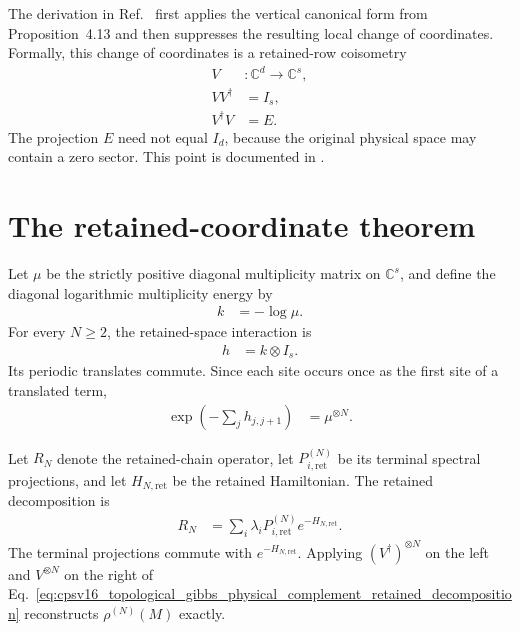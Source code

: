 \documentclass{article}
\begin{document}
The derivation in Ref.~\cite{Cirac2016MPDO_arXiv} first applies the vertical
canonical form from Proposition~4.13 and then suppresses the resulting local
change of coordinates. Formally, this change of coordinates is a retained-row
coisometry
\begin{align}
    V
        &\colon \mathbb C^d\longrightarrow\mathbb C^s,
    \label{eq:cpsv16_topological_gibbs_physical_complement_vertical_map}\\
    VV^\dagger
        &= I_s,
    \label{eq:cpsv16_topological_gibbs_physical_complement_coisometry}\\
    V^\dagger V
        &= E.
    \label{eq:cpsv16_topological_gibbs_physical_complement_retained_projection}
\end{align}
The projection $E$ need not equal $I_d$, because the original physical space
may contain a zero sector. This point is documented in
.

\section{The retained-coordinate theorem}

Let $\mu$ be the strictly positive diagonal multiplicity matrix on
$\mathbb C^s$, and define the diagonal logarithmic multiplicity energy by
\begin{align}
    k
        &= -\log\mu.
    \label{eq:cpsv16_topological_gibbs_physical_complement_retained_energy}
\end{align}
For every $N\geq2$, the retained-space interaction is
\begin{align}
    h
        &= k\otimes I_s.
    \label{eq:cpsv16_topological_gibbs_physical_complement_retained_interaction}
\end{align}
Its periodic translates commute. Since each site occurs once as the first
site of a translated term,
\begin{align}
    \exp\left(-\sum_j h_{j,j+1}\right)
        &= \mu^{\otimes N}.
    \label{eq:cpsv16_topological_gibbs_physical_complement_retained_exponential}
\end{align}

Let $R_N$ denote the retained-chain operator, let
$P_{i,\mathrm{ret}}^{(N)}$ be its terminal spectral projections, and let
$H_{N,\mathrm{ret}}$ be the retained Hamiltonian. The retained decomposition
is
\begin{align}
    R_N
        &= \sum_i\lambda_iP_{i,\mathrm{ret}}^{(N)}
           e^{-H_{N,\mathrm{ret}}}.
    \label{eq:cpsv16_topological_gibbs_physical_complement_retained_decomposition}
\end{align}
The terminal projections commute with $e^{-H_{N,\mathrm{ret}}}$. Applying
$(V^\dagger)^{\otimes N}$ on the left and $V^{\otimes N}$ on the right of
Eq.~\ref{eq:cpsv16_topological_gibbs_physical_complement_retained_decomposition}
reconstructs $\rho^{(N)}(M)$ exactly.
\end{document}
